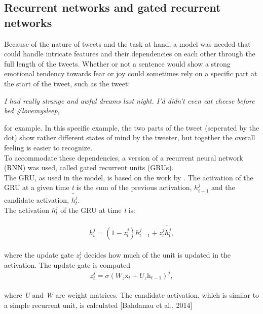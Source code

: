 \subsection{Recurrent networks and gated recurrent networks}
Because of the nature of tweets and the task at hand, a model was needed that could handle intricate features and their dependencies on each other through the full length of the tweets. Whether or not a sentence would show a strong emotional tendency towards fear or joy could sometimes rely on a specific part at the start of the tweet, such as the tweet:\\
\begin{center}
\textit{I had really strange and awful dreams last night. I'd didn't even eat cheese before bed  \#lovemysleep},\\
\end{center}
for example. In this specific example, the two parts of the tweet (seperated by the dot) show rather different states of mind by the tweeter, but together the overall feeling is easier to recognize.\\
To accommodate these dependencies, a version of a recurrent neural network (RNN) was used, called gated recurrent units (GRUs).
\\
The GRU, as used in the model, is based on the work by \cite{chung}. The activation of the GRU at a given time \textit{t} is the sum of the previous activation, $h_{t-1}^{j}$ and the candidate activation, $\tilde{h_{t}^{j}}$.\\
The activation $h_{t}^{j}$ of the GRU at time \textit{t} is:\\
\\
\begin{equation} \label{eq:activation}
h_{t}^{j} = \left(1 - z_{t}^{j}\right)h_{t-1}^{j}+z_{t}^{j}\tilde{h_{t}^{j}},
\end{equation}\\

where the update gate $z_{t}^{j}$ decides how much of the unit is updated in the activation. The update gate is computed\\

\begin{equation}\label{eq:update}
z_{t}^{j}=\sigma\left(W_{z}\mathrm{x}_{t}+U_{z}\mathrm{h}_{t-1}\right)^{j},
\end{equation}\\

where \textit{U} and \textit{W} are weight matrices. The candidate activation, which is similar to a simple recurrent unit, is calculated [Bahdanau et al., 2014]\\

